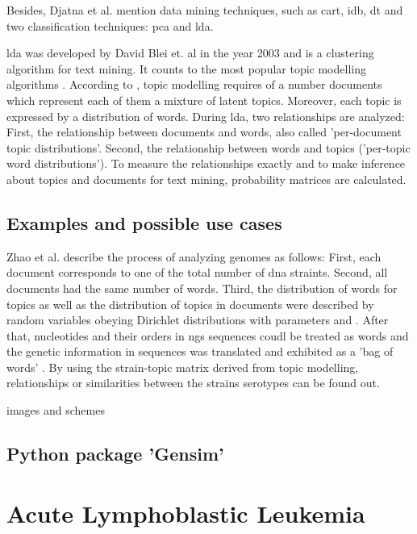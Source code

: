 Besides, Djatna et al. \autocite{djatna_2018} mention data mining techniques, such as \gls{cart}, \gls{idb}, \gls{dt} and two classification techniques: \gls{pca} and \gls{lda}. 

\gls{lda} was developed by David Blei et. al in the year 2003 and is a clustering algorithm for text mining. It counts to the most popular topic modelling algorithms \autocite{zhao_2016}.
According to \autocite{zhao_2016}, topic modelling requires of a number documents which represent each of them a mixture of latent topics. Moreover, each topic is expressed by a distribution of words. During \gls{lda}, two relationships are analyzed: First, the relationship between documents and words, also called 'per-document topic distributions'. Second, the relationship between words and topics ('per-topic word distributions'). To measure the relationships exactly and to make inference about topics and documents for text mining, probability matrices are calculated.
 
\section{Examples and possible use cases}\label{lda_examples}

Zhao et al. describe the process of analyzing genomes as follows: First, each document corresponds to one of the total number of \gls{dna} straints. Second, all documents had the same number of words. Third, the distribution of words for topics as well as the distribution of topics in documents were described by random variables obeying Dirichlet distributions with parameters \alpha and \beta. After that, nucleotides and their orders in \gls{ngs} sequences coudl be treated as words and the genetic information in sequences was translated and exhibited as a 'bag of words' \autocite{zhao_2016}. By using the strain-topic matrix derived from topic modelling, relationships or similarities between the strains serotypes can be found out. 
 
images and schemes
\section{Python package 'Gensim'}\label{gensim}
              
\chapter{Acute Lymphoblastic Leukemia}\label{all}
